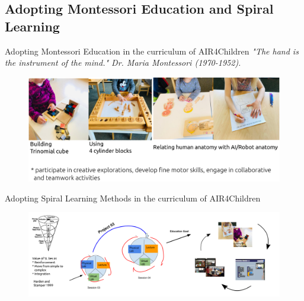 \subsection{Adopting Montessori Education and Spiral Learning}

{
\begin{frame}{Adopting Montessori Education in the curriculum of AIR4Children } 
  \vspace{3mm}
  \it{"The hand is the instrument of the mind."} Dr. Maria Montessori (1970-1952).
  \vspace{2mm}
    \begin{figure}
        \centering
        \includegraphics[width=1.0\textwidth]{./figures/montessori/outputs/drawing-v00.png}
      \end{figure}
\end{frame}
}

{
\begin{frame}{Adopting Spiral Learning Methods in the curriculum of AIR4Children}

  \begin{figure}
        \centering
        \includegraphics[width=1.0\textwidth]{./figures/teaching-materials/outputs/drawing-v02.png}
      \end{figure}
\end{frame}
}

